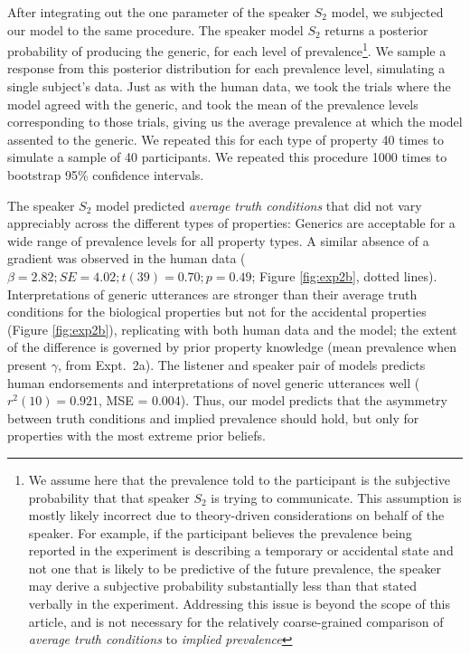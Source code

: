\documentclass[12pt,letterpaper]{article}
\begin{document}
After integrating out the one parameter of the speaker $S_2$ model, we subjected our model to the same procedure. 
The speaker model $S_2$ returns a posterior probability of producing the generic, for each level of prevalence\footnote{We assume here that the prevalence told to the participant is the subjective probability that that speaker $S_2$ is trying to communicate. This assumption is mostly likely incorrect due to theory-driven considerations on behalf of the speaker. For example, if the participant believes the prevalence being reported in the experiment is describing a temporary or accidental state and not one that is likely to be predictive of the future prevalence, the speaker may derive a subjective probability substantially less than that stated verbally in the experiment. Addressing this issue is beyond the scope of this article, and is not necessary for the relatively coarse-grained comparison of \emph{average truth conditions} to \emph{implied prevalence}}. 
We sample a response from this posterior distribution for each prevalence level, simulating a single subject's data.
Just as with the human data, we took the trials where the model agreed with the generic, and took the mean of the prevalence levels corresponding to those trials, giving us the average prevalence at which the model assented to the generic.
We repeated this for each type of property 40 times to simulate a sample of 40 participants. 
We repeated this procedure 1000 times to bootstrap 95\% confidence intervals.

The speaker $S_2$ model predicted \emph{average truth conditions} that did not vary appreciably across the different types of properties:
Generics are acceptable for a wide range of prevalence levels for all property types.
A similar absence of a gradient was observed in the human data ($\beta = 2.82; SE = 4.02; t(39) = 0.70; p = 0.49$; Figure \ref{fig:exp2b}, dotted lines). 
Interpretations of generic utterances are stronger than their average truth conditions for the biological properties but not for the accidental properties (Figure \ref{fig:exp2b}), replicating  with both human data and the model; the extent of the difference is governed by prior property knowledge (mean prevalence when present $\gamma$, from Expt.~2a).
The listener and speaker pair of models predicts human endorsements and interpretations of novel generic utterances well ($r^2(10) = 0.921$, MSE = 0.004).
Thus, our model predicts that the asymmetry between truth conditions and implied prevalence should hold, but only for properties with the most extreme prior beliefs.
\end{document}
